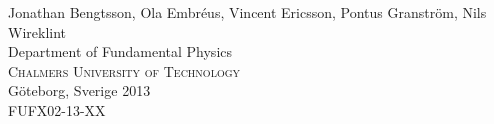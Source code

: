 \documentclass[../main/report.tex]{subfiles}
\begin{document}
\begin{titlepage}
\begin{flushleft}
{    

	{\Large Jonathan Bengtsson, Ola Embréus, Vincent Ericsson, Pontus Granström, Nils Wireklint}\\[1 cm]

	

	{\Large Department of Fundamental Physics \\

	\textsc{Chalmers University of Technology} \\

	Göteborg, Sverige 2013 \\

    FUFX02-13-XX\\

	} 

	}

\end{flushleft}



\end{titlepage}



\ClearShipoutPicture



\newpage 
\end{document}
